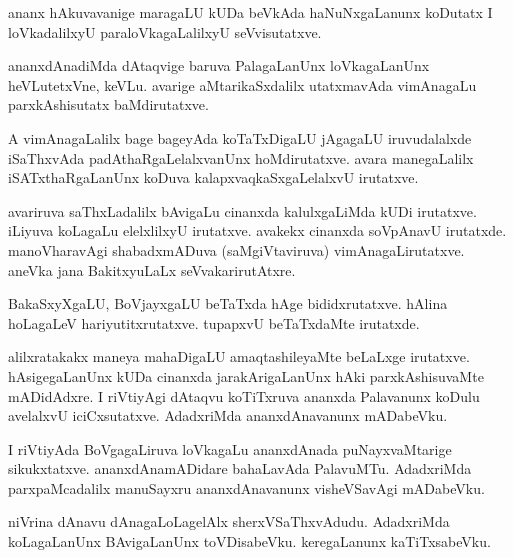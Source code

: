 \documentclass{article}
\begin{document}
\begin{mn}%
ananx hAkuvavanige maragaLU kUDa beVkAda haNuNxgaLanunx koDutatx I loVkadalilxyU paraloVkagaLalilxyU 
seVvisutatxve.
\end{mn}

\begin{mn}%
ananxdAnadiMda dAtaqvige baruva PalagaLanUnx loVkagaLanUnx heVLutetxVne, keVLu. avarige 
aMtarikaSxdalilx utatxmavAda vimAnagaLu parxkAshisutatx baMdirutatxve.
\end{mn}

\begin{mn}%
A vimAnagaLalilx bage bageyAda koTaTxDigaLU jAgagaLU iruvudalalxde iSaThxvAda padAthaRgaLelalxvanUnx 
hoMdirutatxve. avara manegaLalilx iSATxthaRgaLanUnx koDuva kalapxvaqkaSxgaLelalxvU irutatxve.
\end{mn}

\begin{mn}%
avariruva saThxLadalilx bAvigaLu cinanxda kalulxgaLiMda kUDi irutatxve. iLiyuva koLagaLu elelxlilxyU 
irutatxve. avakekx cinanxda soVpAnavU irutatxde. manoVharavAgi shabadxmADuva (saMgiVtaviruva) 
vimAnagaLirutatxve. aneVka jana BakitxyuLaLx seVvakarirutAtxre.
\end{mn}

\begin{mn}%
BakaSxyXgaLU, BoVjayxgaLU beTaTxda hAge bididxrutatxve. hAlina hoLagaLeV hariyutitxrutatxve. 
tupapxvU beTaTxdaMte irutatxde.
\end{mn}

\begin{mn}%
alilxratakakx maneya mahaDigaLU amaqtashileyaMte beLaLxge irutatxve. hAsigegaLanUnx kUDa cinanxda 
jarakArigaLanUnx hAki parxkAshisuvaMte mADidAdxre. I riVtiyAgi dAtaqvu koTiTxruva ananxda 
Palavanunx koDulu avelalxvU iciCxsutatxve. AdadxriMda ananxdAnavanunx mADabeVku.
\end{mn}

\begin{mn}%
I riVtiyAda BoVgagaLiruva loVkagaLu ananxdAnada puNayxvaMtarige sikukxtatxve. ananxdAnamADidare 
bahaLavAda PalavuMTu. AdadxriMda parxpaMcadalilx manuSayxru ananxdAnavanunx visheVSavAgi mADabeVku.
\end{mn}


\begin{mn}%
niVrina dAnavu dAnagaLoLagelAlx sherxVSaThxvAdudu. AdadxriMda koLagaLanUnx BAvigaLanUnx toVDisabeVku. 
keregaLanunx kaTiTxsabeVku.
\end{mn}
\end{document}
